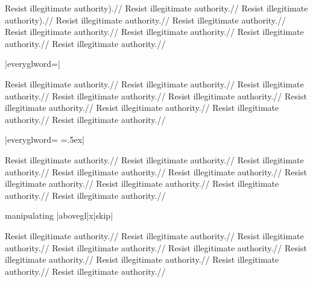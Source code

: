 
%
%
%
%
%

\ex
\begingl[glstyle=wrap,everygla=\ninerm,everyglb=\tenrm,
   everyglc=\elevenrm,everygld=\twelverm,everygle=\twelvebf,everyglf=\ninerm]
\gla Resist illegitimate authority).//
\glb Resist illegitimate authority.//
\glc Resist illegitimate authority).//
\gld Resist illegitimate authority.//
\gle Resist illegitimate authority.//
\gld Resist illegitimate authority.//
\glc Resist illegitimate authority.//
\glb Resist illegitimate authority.//
\glf Resist illegitimate authority.//
\endgl
\xe

\ex  |everyglword=\offinterlineskip|
\medskip

\leavevmode
\begingl[glstyle=wrap,everygla=\ninerm,everyglb=\tenrm,
   everyglc=\elevenrm,everygld=\twelverm,everygle=\twelvebf,everyglf=\ninerm,
   everyglword=\offinterlineskip]
\gla Resist illegitimate authority.//
\glb Resist illegitimate authority.//
\glc Resist illegitimate authority.//
\gld Resist illegitimate authority.//
\gle Resist illegitimate authority.//
\gld Resist illegitimate authority.//
\glc Resist illegitimate authority.//
\glb Resist illegitimate authority.//
\glf Resist illegitimate authority.//
\endgl
\xe

\ex |everyglword={\baselineskip=0pt
\lineskip=.5ex}|
\smallskip

\leavevmode
\begingl[glstyle=wrap,everygla=\ninerm,everyglb=\tenrm,
   everyglc=\elevenrm,everygld=\twelverm,everygle=\twelvebf,everyglf=\ninerm,
   everyglword={\baselineskip=0pt \lineskip=.5ex}]
\gla Resist illegitimate authority.//
\glb Resist illegitimate authority.//
\glc Resist illegitimate authority.//
\gld Resist illegitimate authority.//
\gle Resist illegitimate authority.//
\gld Resist illegitimate authority.//
\glc Resist illegitimate authority.//
\glb Resist illegitimate authority.//
\glf Resist illegitimate authority.//
\endgl
\xe

\ex manipulating |abovegl|x|skip|
\smallskip

\leavevmode
\begingl[glstyle=wrap,everygla=\ninerm,everyglb=\tenrm,
   everyglc=\elevenrm,everygld=\twelverm,everygle=\twelvebf,everyglf=\ninerm,
   everyglword={\baselineskip=0pt \lineskip=.3ex}]
\gla Resist illegitimate authority.//
\glb Resist illegitimate authority.//
\glc Resist illegitimate authority.//
\gld Resist illegitimate authority.//
\gle[abovegleskip=2ex] Resist illegitimate authority.//
\gld[abovegldskip=2ex] Resist illegitimate authority.//
\glc Resist illegitimate authority.//
\glb Resist illegitimate authority.//
\glf Resist illegitimate authority.//
\endgl
\xe

